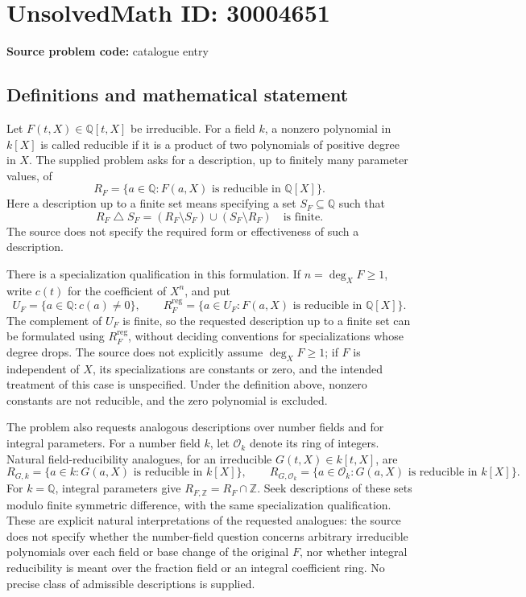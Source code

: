 \documentclass[11pt]{article}
\newcommand{\Z}{\mathbb{Z}}
\newcommand{\Q}{\mathbb{Q}}
\begin{document}
\section*{UnsolvedMath ID: 30004651}
\textbf{Source problem code:} catalogue entry
\subsection{Definitions and mathematical statement}
Let \(F(t,X)\in\Q[t,X]\) be irreducible. For a field \(k\), a nonzero polynomial in \(k[X]\) is called reducible if it is a product of two polynomials of positive degree in \(X\). The supplied problem asks for a description, up to finitely many parameter values, of
\[
R_F=\{a\in\Q:F(a,X)\text{ is reducible in }\Q[X]\}.
\]
Here a description up to a finite set means specifying a set \(S_F\subseteq\Q\) such that
\[
R_F\mathbin{\triangle}S_F
=(R_F\setminus S_F)\cup(S_F\setminus R_F)
\quad\text{is finite}.
\]
The source does not specify the required form or effectiveness of such a description.

There is a specialization qualification in this formulation. If \(n=\deg_X F\geq1\), write \(c(t)\) for the coefficient of \(X^n\), and put
\[
U_F=\{a\in\Q:c(a)\ne0\},\qquad
R_F^{\mathrm{reg}}=\{a\in U_F:F(a,X)\text{ is reducible in }\Q[X]\}.
\]
The complement of \(U_F\) is finite, so the requested description up to a finite set can be formulated using \(R_F^{\mathrm{reg}}\), without deciding conventions for specializations whose degree drops. The source does not explicitly assume \(\deg_XF\geq1\); if \(F\) is independent of \(X\), its specializations are constants or zero, and the intended treatment of this case is unspecified. Under the definition above, nonzero constants are not reducible, and the zero polynomial is excluded.

The problem also requests analogous descriptions over number fields and for integral parameters. For a number field \(k\), let \(\mathcal O_k\) denote its ring of integers. Natural field-reducibility analogues, for an irreducible \(G(t,X)\in k[t,X]\), are
\[
R_{G,k}=\{a\in k:G(a,X)\text{ is reducible in }k[X]\},
\qquad
R_{G,\mathcal O_k}=\{a\in\mathcal O_k:G(a,X)\text{ is reducible in }k[X]\}.
\]
For \(k=\Q\), integral parameters give \(R_{F,\Z}=R_F\cap\Z\). Seek descriptions of these sets modulo finite symmetric difference, with the same specialization qualification. These are explicit natural interpretations of the requested analogues: the source does not specify whether the number-field question concerns arbitrary irreducible polynomials over each field or base change of the original \(F\), nor whether integral reducibility is meant over the fraction field or an integral coefficient ring. No precise class of admissible descriptions is supplied.
\end{document}
